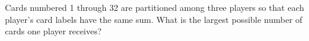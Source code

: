 Cards numbered 1 through 32 are partitioned among three players so that each player's card labels have the same sum. What is the largest possible number of cards one player receives?
